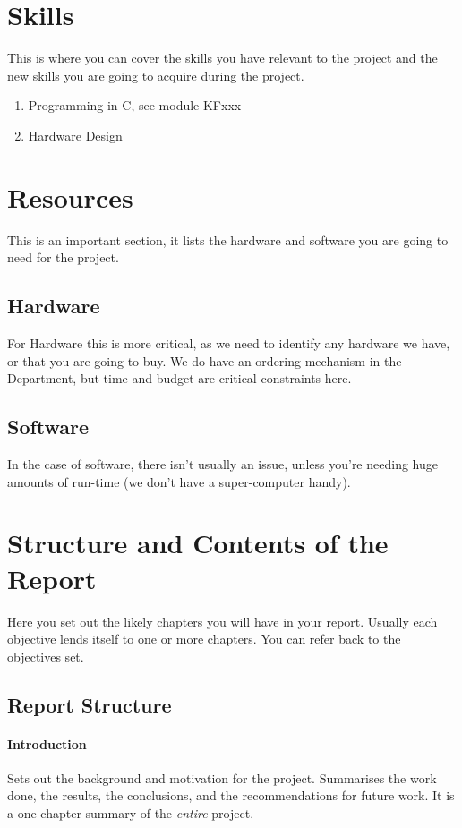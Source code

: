 \section{Skills}
This is where you can cover the skills you have relevant to the project and the new skills you are going to acquire during the project.
\begin{enumerate}
	\item Programming in C, see module KFxxx
	\item Hardware Design
\end{enumerate}

\section{Resources}
This is an important section, it lists the hardware and software you are going to need for the project.

\subsection{Hardware}
For Hardware this is more critical, as we need to identify any hardware we have, or that you are going to buy.  We do have an ordering mechanism in the Department, but time and budget are critical constraints here.

\subsection{Software}
In the case of software, there isn't usually an issue, unless you're needing huge amounts of run-time (we don't have a super-computer handy).

\section{Structure and Contents of the Report}
Here you set out the likely chapters you will have in your report.  Usually each objective lends itself to one or more chapters.  You can refer back to the objectives set.
\subsection{Report Structure}

\paragraph{Introduction}  Sets out the background and motivation for the project.  Summarises the work done, the results, the conclusions, and the recommendations for future work.  It is a one chapter summary of the \emph{entire} project.

